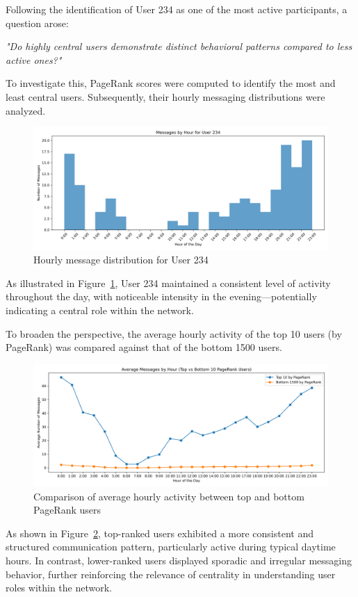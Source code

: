 Following the identification of User 234 as one of the most active participants, a question arose:

\textit{"Do highly central users demonstrate distinct behavioral patterns compared to less active ones?"}

To investigate this, PageRank scores were computed to identify the most and least central users. Subsequently, their hourly messaging distributions were analyzed.

\begin{figure}[H]
    \centering
    \includegraphics[width=0.6\linewidth]{../Images/user_234_messages_by_hour.png}
    \caption{Hourly message distribution for User 234}
    \label{fig:user234-hourly}
\end{figure}

As illustrated in Figure~\ref{fig:user234-hourly}, User 234 maintained a consistent level of activity throughout the day, with noticeable intensity in the evening—potentially indicating a central role within the network.

To broaden the perspective, the average hourly activity of the top 10 users (by PageRank) was compared against that of the bottom 1500 users.

\begin{figure}[H]
    \centering
    \includegraphics[width=0.5\linewidth]{../Images/average_messages_by_hour_top_bottom.png}
    \caption{Comparison of average hourly activity between top and bottom PageRank users}
    \label{fig:top-vs-bottom}
\end{figure}

As shown in Figure~\ref{fig:top-vs-bottom}, top-ranked users exhibited a more consistent and structured communication pattern, particularly active during typical daytime hours. In contrast, lower-ranked users displayed sporadic and irregular messaging behavior, further reinforcing the relevance of centrality in understanding user roles within the network.
